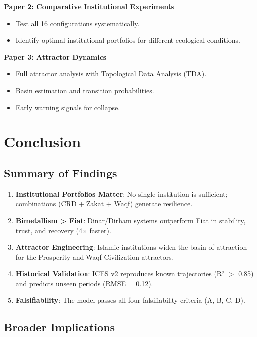 \documentclass[12pt,a4paper]{article}
\begin{document}
\textbf{Paper 2: Comparative Institutional Experiments}
\begin{itemize}
    \item Test all 16 configurations systematically.
    \item Identify optimal institutional portfolios for different ecological conditions.
\end{itemize}

\textbf{Paper 3: Attractor Dynamics}
\begin{itemize}
    \item Full attractor analysis with Topological Data Analysis (TDA).
    \item Basin estimation and transition probabilities.
    \item Early warning signals for collapse.
\end{itemize}

\section{Conclusion}

\subsection{Summary of Findings}

\begin{enumerate}
    \item \textbf{Institutional Portfolios Matter}: No single institution is sufficient; combinations (CRD + Zakat + Waqf) generate resilience.
    \item \textbf{Bimetallism > Fiat}: Dinar/Dirham systems outperform Fiat in stability, trust, and recovery (4$\times$ faster).
    \item \textbf{Attractor Engineering}: Islamic institutions widen the basin of attraction for the Prosperity and Waqf Civilization attractors.
    \item \textbf{Historical Validation}: ICES v2 reproduces known trajectories (R² $>$ 0.85) and predicts unseen periods (RMSE = 0.12).
    \item \textbf{Falsifiability}: The model passes all four falsifiability criteria (A, B, C, D).
\end{enumerate}

\subsection{Broader Implications}
\end{document}
